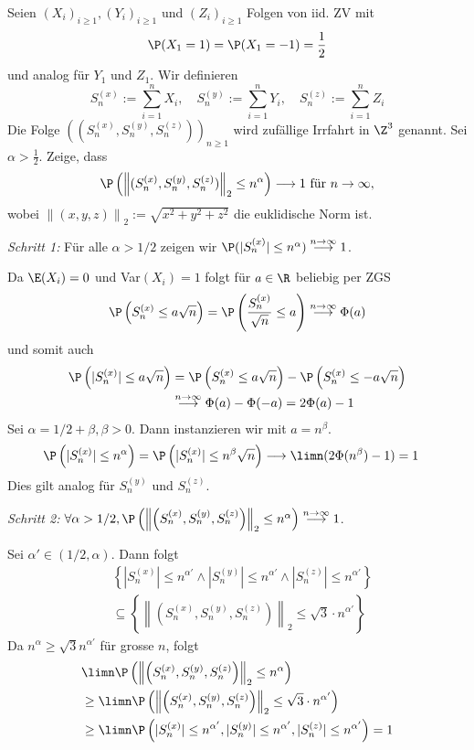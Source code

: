 Seien $(X_i)_{i \geq 1}, (Y_i)_{i \geq 1}$ und $(Z_i)_{i \geq 1}$ Folgen von iid. ZV mit
$$\P(X_1 = 1) = \P(X_1 = -1) = \frac{1}{2}$$
und analog für $Y_1$ und $Z_1$. Wir definieren
$$S_n^{(x)} := \sum_{i=1}^n X_i, \quad S_n^{(y)} := \sum_{i=1}^n Y_i, \quad S_n^{(z)} := \sum_{i=1}^n Z_i$$
Die Folge $\left((S_n^{(x)}, S_n^{(y)}, S_n^{(z)})\right)_{n \geq 1}$ wird zufällige Irrfahrt in $\Z^3$ genannt. Sei $\alpha > \frac{1}{2}$. Zeige, dass
$$\P\left(\left\lVert(S_n^{(x)}, S_n^{(y)}, S_n^{(z)})\right\rVert_2 \leq n^\alpha\right) \longrightarrow 1 \text{ für } n \to \infty,$$
wobei $\left\lVert(x,y,z)\right\rVert_2 := \sqrt{x^2+y^2+z^2}$ die euklidische Norm ist.

\textit{Schritt 1: } Für alle $\alpha > 1/2$ zeigen wir $\P(|S_n^{(x)}| \leq n^\alpha) \overset{n \to \infty}{\longrightarrow} 1$.

Da $\E(X_i) = 0$ und Var$(X_i) = 1$ folgt für $a \in \R$ beliebig per ZGS
$$\P\left(S_n^{(x)} \leq a \sqrt{n}\right) = \P\left(\frac{S_n^{(x)}}{\sqrt{n}} \leq a\right) \overset{n \to \infty}{\longrightarrow} \Phi(a)$$
und somit auch
\begin{align*}
    \P\left(|S_n^{(x)}| \leq a\sqrt{n}\right) &= \P\left(S_n^{(x)} \leq a \sqrt{n}\right) -\P\left(S_n^{(x)} \leq - a \sqrt{n}\right) \\
    &\overset{n \to \infty}{\longrightarrow} \Phi(a) - \Phi(-a) = 2\Phi(a)-1
\end{align*}
Sei $\alpha = 1/2 + \beta, \beta > 0$. Dann instanzieren wir mit $a = n^\beta$.
\begin{align*}
    \P\left(|S_n^{(x)}| \leq n^\alpha\right) &= \P\left(|S_n^{(x)}| \leq n^\beta\sqrt{n}\right) \longrightarrow \limn(2 \Phi(n^\beta)-1) = 1
\end{align*}
Dies gilt analog für $S_n^{(y)}$ und $S_n^{(z)}$.

\textit{Schritt 2:} $\forall \alpha > 1/2, \P\left(\left\lVert\left(S_n^{(x)}, S_n^{(y)}, S_n^{(z)}\right)\right\rVert_2 \leq n^\alpha\right) \overset{n \to \infty}{\longrightarrow} 1$.

Sei $\alpha' \in (1/2, \alpha)$. Dann folgt 
\begin{align*}
    &\left\{|S_n^{(x)}| \leq n^{\alpha'} \land |S_n^{(y)}| \leq n^{\alpha'} \land |S_n^{(z)}| \leq n^{\alpha'}\right\} \\
    &\subseteq \left\{\left\lVert\left(S_n^{(x)}, S_n^{(y)}, S_n^{(z)}\right)\right\rVert_2 \leq \sqrt{3} \cdot n^{\alpha'}\right\}
\end{align*}
Da $n^\alpha \geq \sqrt{3}n^{\alpha'}$ für grosse $n$, folgt
\begin{align*}
    &\limn \P\left(\left\lVert\left(S_n^{(x)}, S_n^{(y)}, S_n^{(z)}\right)\right\rVert_2 \leq n^\alpha\right)\\
     &\geq \limn \P\left(\left\lVert\left(S_n^{(x)}, S_n^{(y)}, S_n^{(z)}\right)\right\rVert_2 \leq \sqrt{3} \cdot n^{\alpha'}\right)\\
     &\geq \limn \P\left(|S_n^{(x)}| \leq n^{\alpha'}, |S_n^{(y)}| \leq n^{\alpha'}, |S_n^{(z)}| \leq n^{\alpha'}\right) = 1
\end{align*}